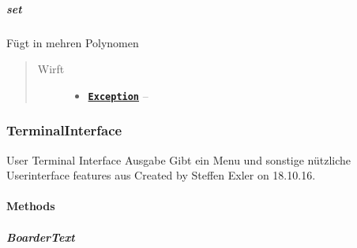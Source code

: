\documentclass[letterpaper,10pt,ngerman]{sphinxmanual}
\begin{document}
\subparagraph{set}
\label{com/linuxluigi/polynomial/PolynomialTest:set}

\begin{fulllineitems}
\label{com/linuxluigi/polynomial/PolynomialTest:com.linuxluigi.polynomial.PolynomialTest.set()}
Fügt in mehren Polynomen
\begin{quote}\begin{description}
\item[{Wirft}] \leavevmode\begin{itemize}
\item {} 
\href{http://docs.oracle.com/javase/6/docs/api/java/lang/Exception.html}{\textbf{\texttt{Exception}}} -- 

\end{itemize}

\end{description}\end{quote}

\end{fulllineitems}



\subsubsection{TerminalInterface}
\label{com/linuxluigi/polynomial/TerminalInterface:terminalinterface}\label{com/linuxluigi/polynomial/TerminalInterface::doc}

\begin{fulllineitems}
\label{com/linuxluigi/polynomial/TerminalInterface:com.linuxluigi.polynomial.TerminalInterface}
User Terminal Interface Ausgabe Gibt ein Menu und sonstige nützliche Userinterface features aus Created by Steffen Exler on 18.10.16.

\end{fulllineitems}



\paragraph{Methods}
\label{com/linuxluigi/polynomial/TerminalInterface:methods}

\subparagraph{BoarderText}
\label{com/linuxluigi/polynomial/TerminalInterface:boardertext}
\end{document}
